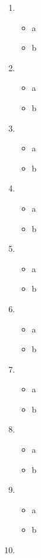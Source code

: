 \documentclass{article}
\begin{document}
\begin{enumerate}
\item
\begin{itemize}
\item{a}
\item{b}
\end{itemize}
\item
\begin{itemize}
\item{a}
\item{b}
\end{itemize}
\item
\begin{itemize}
\item{a}
\item{b}
\end{itemize}
\item
\begin{itemize}
\item{a}
\item{b}
\end{itemize}
\item
\begin{itemize}
\item{a}
\item{b}
\end{itemize}
\item
\begin{itemize}
\item{a}
\item{b}
\end{itemize}
\item
\begin{itemize}
\item{a}
\item{b}
\end{itemize}
\item
\begin{itemize}
\item{a}
\item{b}
\end{itemize}
\item
\begin{itemize}
\item{a}
\item{b}
\end{itemize}
\item
\begin{itemize}

\end{itemize}
\end{enumerate}
\end{document}
